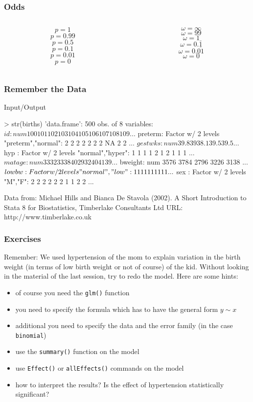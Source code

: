 \begin{frame}\frametitle{Odds}
\begin{columns}
  \begin{column}{0.4\textwidth}
    $$p = 1$$
    $$p = 0.99$$
    $$p = 0.5$$
    $$p = 0.1$$
    $$p = 0.01$$
    $$p = 0$$    
  \end{column}
  \begin{column}{0.4\textwidth}
    $$\omega = \infty$$
    $$\omega = 99$$
    $$\omega = 1$$
    $$\omega = 0.\bar{1}$$
    $$\omega = 0.\overline{01}$$
    $$\omega = 0$$
  \end{column}
\end{columns}
\end{frame}


\begin{frame}[fragile]\frametitle{Remember the Data}
\footnotesize
\begin{exampleblock}{Input/Output}
\begin{semiverbatim}
  > str(births)
  'data.frame':	500 obs. of  8 variables:
 $ id     : num  100 101 102 103 104 105 106 107 108 109 ...
 $ preterm: Factor w/ 2 levels "preterm","normal": 2 2 2 2 2 2 2 NA 2 2 ...
 $ gestwks: num  39.8 39 38.1 39.5 39.5 ...
 $ hyp    : Factor w/ 2 levels "normal","hyper": 1 1 1 1 2 1 2 1 1 1 ...
 $ matage : num  33 32 33 38 40 29 32 40 41 39 ...
 $ bweight: num  3576 3784 2796 3226 3138 ...
 $ lowbw  : Factor w/ 2 levels "normal","low": 1 1 1 1 1 1 1 1 1 1 ...
 $ sex    : Factor w/ 2 levels "M","F": 2 2 2 2 2 2 1 1 2 2 ...
\end{semiverbatim}
\end{exampleblock}
Data from: Michael Hills and Bianca De Stavola (2002). A Short Introduction
     to Stata 8 for Biostatistics, Timberlake Consultants Ltd URL:
     http://www.timberlake.co.uk
\end{frame}

\begin{frame}[fragile]\frametitle{Exercises}
Remember: We used hypertension of the mom to explain variation in the birth weight (in terms of low birth weight or not of course) of the kid. Without looking in the material of the last session, try to redo the model. Here are some hints:
\begin{itemize}
\item of course you need the \texttt{glm()} function
\item you need to specify the formula which has to have the general form $y \sim x$
\item additional you need to specify the data and the error family (in the case \texttt{binomial})
\item use the \texttt{summary()} function on the model
\item use \texttt{Effect()} or \texttt{allEffects()} commands on the model
\item how to interpret the results? Is the effect of hypertension statistically significant?
\end{itemize}
\end{frame}



